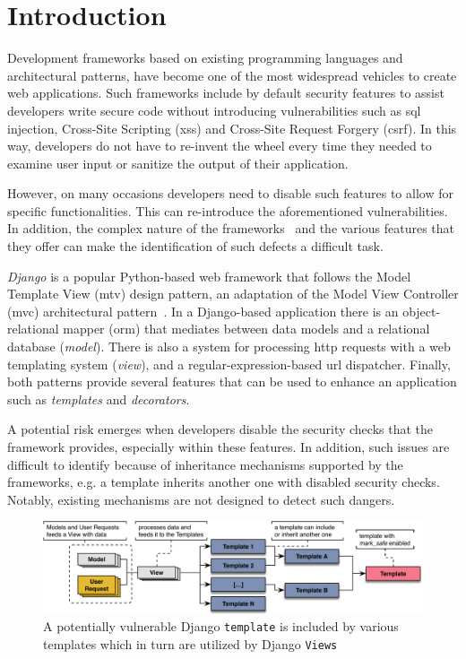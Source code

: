 \section{Introduction}
Development frameworks based on existing
programming languages and architectural patterns,
have become one of the most
widespread vehicles to create web
applications.
Such frameworks include by default
security features to assist
developers write secure code without
introducing vulnerabilities such as
{\sc sql} injection,
Cross-Site Scripting ({\sc xss}) and
Cross-Site Request Forgery ({\sc csrf}).
In this way,
developers do not have to re-invent the wheel every time they needed to examine
user input or sanitize the output of their
application.

However,
on many occasions developers need
to disable such features to
allow for specific functionalities.
This can re-introduce the
aforementioned vulnerabilities.
In addition,
the complex nature of the
frameworks~\cite{OPM15}
and the various features that they offer
can make the identification of
such defects a difficult task.

{\it Django} is a popular Python-based web
framework that follows the Model
Template View ({\sc mtv}) design pattern,
an adaptation of the
Model View Controller ({\sc mvc})
architectural pattern~\cite{GLH03, BD04}.
In a Django-based application
there is an object-relational mapper
({\sc orm}) that mediates between data models
and a relational database ({\it model}).
There is also a system for
processing {\sc http} requests with
a web templating system ({\it view}),
and a regular-expression-based
{\sc url} dispatcher.
Finally,
both patterns provide several features that
can be used to enhance an application such
as {\it templates} and {\it decorators}.

A potential risk emerges when developers
disable the security checks that the
framework provides,
especially within these features.
In addition,
such issues are difficult to identify because
of inheritance mechanisms supported
by the frameworks,
e.g. a template inherits another one with
disabled security checks.
Notably,
existing mechanisms are not designed
to detect such dangers.

\begin{figure}[t]
    \begin{center}
        \includegraphics[scale=0.65]{defect_2.pdf}
        \vspace{-2mm}
        \caption{A potentially vulnerable Django
        {\tt template} is included by various templates which in turn are utilized by Django
        {\tt Views}}\label{fig:defect}
    \end{center}
    \vspace{-5mm}
\end{figure}

